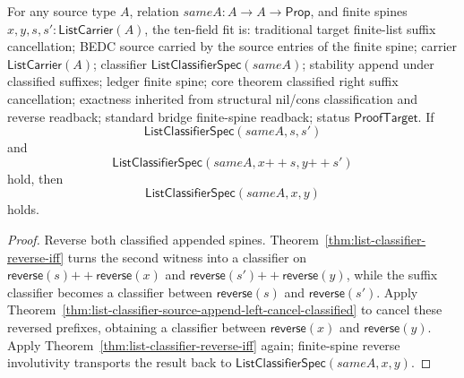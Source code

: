 \begin{theorem}
\label{thm:list-classifier-source-append-right-cancel-classified}
For any source type $A$, relation $sameA:A\to A\to\mathsf{Prop}$, and finite
spines $x,y,s,s':\mathsf{ListCarrier}(A)$, the ten-field fit is: traditional
target finite-list suffix cancellation; BEDC source carried by the source
entries of the finite spine; carrier $\mathsf{ListCarrier}(A)$; classifier
$\mathsf{ListClassifierSpec}(sameA)$; stability append under classified
suffixes; ledger finite spine; core theorem classified right suffix
cancellation; exactness inherited from structural nil/cons classification and
reverse readback; standard bridge finite-spine readback; status
$\mathsf{ProofTarget}$. If
$$
\mathsf{ListClassifierSpec}(sameA,s,s')
$$
and
$$
\mathsf{ListClassifierSpec}(sameA,x{++}s,y{++}s')
$$
hold, then
$$
\mathsf{ListClassifierSpec}(sameA,x,y)
$$
holds.
\end{theorem}
\begin{proof}
Reverse both classified appended spines. Theorem~\ref{thm:list-classifier-reverse-iff}
turns the second witness into a classifier on
$\mathsf{reverse}(s){++}\mathsf{reverse}(x)$ and
$\mathsf{reverse}(s'){++}\mathsf{reverse}(y)$, while the suffix classifier
becomes a classifier between $\mathsf{reverse}(s)$ and
$\mathsf{reverse}(s')$. Apply Theorem~\ref{thm:list-classifier-source-append-left-cancel-classified}
to cancel these reversed prefixes, obtaining a classifier between
$\mathsf{reverse}(x)$ and $\mathsf{reverse}(y)$. Apply
Theorem~\ref{thm:list-classifier-reverse-iff} again; finite-spine reverse
involutivity transports the result back to
$\mathsf{ListClassifierSpec}(sameA,x,y)$.
\end{proof}

